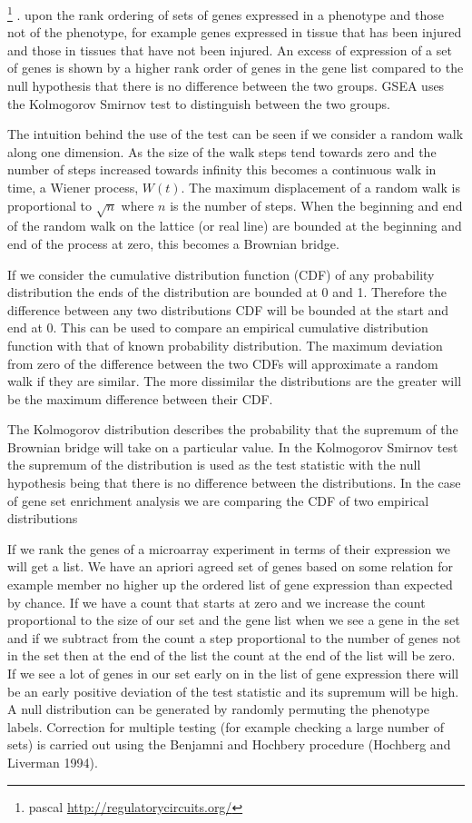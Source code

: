 \footnote{pascal \url{http://regulatorycircuits.org/}}
. upon the rank ordering of sets of genes expressed in a phenotype and those not of the phenotype, for example genes expressed in tissue that has been injured and those in tissues that have not been injured. An excess of expression of a set of genes is shown by a higher rank order of genes in the gene list compared to the null hypothesis that there is no difference between the two groups. GSEA \cite{subramanian2005gene} uses the Kolmogorov Smirnov test to distinguish between the two groups. 

 The intuition behind the use of the test can be seen if we consider a random walk along one dimension. As the size of the walk steps tend towards zero and the number of steps increased towards infinity this becomes a continuous walk in time, a Wiener process, $W(t)$. The maximum displacement of a random walk is proportional to $\sqrt{n}$ where $n$ is the number of steps. When the beginning and end of the random walk on the lattice (or real line) are bounded at the beginning and end of the process at zero, this becomes a Brownian bridge.

If we consider the cumulative distribution function (CDF) of any probability distribution the ends of the distribution are bounded at 0 and 1. Therefore the difference between any two distributions CDF will be bounded at the start and end at 0. This can be used to compare an empirical cumulative distribution function with that of known probability distribution. The maximum deviation from zero of the difference between the two CDFs will approximate a random walk if they are similar. The more dissimilar the distributions are the greater will be the maximum difference between their CDF.

The Kolmogorov distribution describes the probability that the supremum of the Brownian bridge will take on a particular value. In the Kolmogorov Smirnov test the supremum of the distribution is used as the test statistic with the null hypothesis being that there is no difference between the distributions. In the case of gene set enrichment analysis we are comparing the CDF of two empirical distributions \cite{clark2011introduction}

If we rank the genes of a microarray experiment in terms of their expression we will get a list. We have an apriori agreed set of genes based on some relation for example member no higher up the ordered list of gene expression than expected by chance. If we have a count that starts at zero and we increase the count proportional to the size of our set and the gene list when we see a gene in the set and if we subtract from the count a step proportional to the number of genes not in the set then at the end of the list the count at the end of the list will be zero. If we see a lot of genes in our set early on in the list of gene expression there will be an early positive deviation of the test statistic and its supremum will be high. A null distribution can be generated by randomly permuting the phenotype labels. Correction for multiple testing (for example checking a large number of sets) is carried out using the Benjamni and Hochbery procedure (Hochberg and Liverman 1994).

